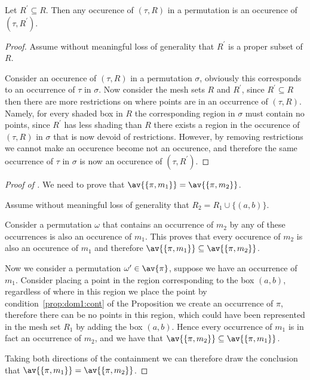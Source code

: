 \begin{note}
    \label{not:downcmesh}
    Let \(R^\prime \subseteq R\). Then any occurence of \((\tau, R)\) in a permutation
    is an occurence of \((\tau,R^\prime)\).
\end{note}
\begin{proof}
    Assume without meaningful loss of generality that \(R^\prime\) is a proper
    subset of \(R\).

    Consider an occurence of \((\tau, R)\) in a permutation \(\sigma\), obviously
    this corresponds to an occurrence of \(\tau\) in \(\sigma\). Now consider
    the mesh sets \(R\) and \(R^\prime\), since \(R^\prime \subseteq R\) then
    there are more restrictions on where points are in an occurrence of \((\tau,R)\).
    Namely, for every shaded box in \(R\) the corresponding region in \(\sigma\)
    must contain no points, since \(R^\prime\) has less shading than \(R\) there
    exists a region in the occurence of \((\tau,R)\) in \(\sigma\) that is
    now devoid of restrictions. However, by removing restrictions we cannot
    make an occurence become not an occurence, and therefore the same occurrence
    of \(\tau \) in \(\sigma\) is now an occurence of \((\tau, R^\prime)\).
\end{proof}
\begin{proof}[Proof of ]
    We need to prove that \(\av{\{\pi,m_1\}} = \av{\{\pi,m_2\}}\).

    Assume without meaningful loss of generality that \(R_2 = R_1 \cup \{(a,b)\}\).

    Consider a permutation \(\omega\) that contains an occurrence of \(m_2\)
    by  any of these occurrences is also an occurence
    of \(m_1\). This proves that every occurence of \(m_2\) is also an
    occurence of \(m_1\) and therefore \(\av{\{\pi,m_1\}} \subseteq \av{\{\pi,m_2\}}\).

    Now we consider a permutation \(\omega^\prime\in \av{\pi}\),
    suppose we have an occurrence of \(m_1\). Consider placing a point in the
    region corresponding to the box \((a,b)\), regardless of where in this
    region we place the point by condition~\ref{prop:dom1:cont} of the
    Proposition we create an occurrence of \(\pi\), therefore there can be no
    points in this region, which could have been represented in the mesh set
    \(R_1\) by adding the box \((a,b)\). Hence every occurrence of
    \(m_1\) is in fact an occurrence of \(m_2\), and we have that
    \(\av{\{\pi,m_2\}} \subseteq \av{\{\pi,m_1\}}\).

    Taking both directions of the containment we can therefore draw the
    conclusion that \(\av{\{\pi,m_1\}} = \av{\{\pi,m_2\}}\).
\end{proof}


